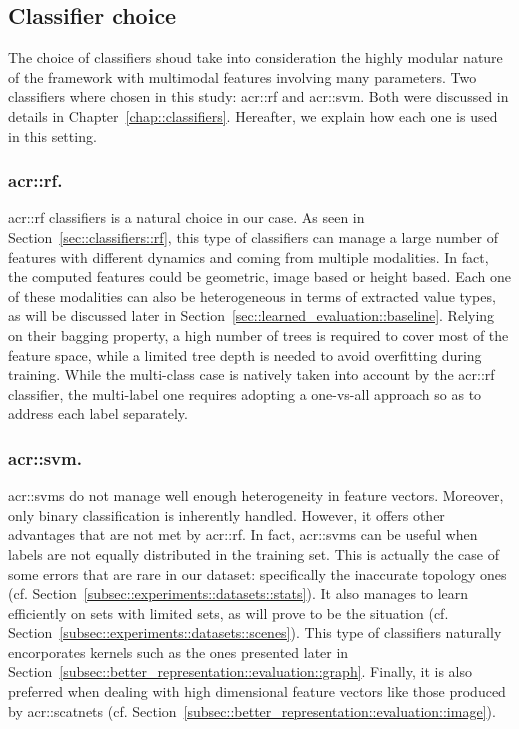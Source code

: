     \subsection{Classifier choice}
        \label{subsec::learned_evaluation::classification::classifiers}
        The choice of classifiers shoud take into consideration the highly modular nature of the framework with multimodal features involving many parameters.
        Two classifiers where chosen in this study: \gls{acr::rf} and \gls{acr::svm}.
        Both were discussed in details in Chapter~\ref{chap::classifiers}.
        Hereafter, we explain how each one is used in this setting.

        \subsubsection{\acrlong*{acr::rf}.}
            \gls{acr::rf} classifiers is a natural choice in our case.
            As seen in Section~\ref{sec::classifiers::rf}, this type of classifiers can manage a large number of features with different dynamics and coming from multiple modalities.
            In fact, the computed features could be geometric, image based or height based.
            Each one of these modalities can also be heterogeneous in terms of extracted value types, as will be discussed later in Section~\ref{sec::learned_evaluation::baseline}.
            Relying on their bagging property, a high number of trees is required to cover most of the feature space, while a limited tree depth is needed to avoid overfitting during training.
            While the multi-class case is natively taken into account by the \gls{acr::rf} classifier, the multi-label one requires adopting a one-vs-all approach so as to address each label separately.

        \subsubsection{\acrshort*{acr::svm}.}
            \glspl{acr::svm} do not manage well enough heterogeneity in feature vectors.
            Moreover, only binary classification is inherently handled.
            However, it offers other advantages that are not met by \gls{acr::rf}.
            In fact, \glspl{acr::svm} can be useful when labels are not equally distributed in the training set.
            This is actually the case of some errors that are rare in our dataset: specifically the inaccurate topology ones (cf. Section~\ref{subsec::experiments::datasets::stats}).
            It also manages to learn efficiently on sets with limited sets, as will prove to be the situation (cf. Section~\ref{subsec::experiments::datasets::scenes}). 
            This type of classifiers naturally encorporates kernels such as the ones presented later in Section~\ref{subsec::better_representation::evaluation::graph}.
            Finally, it is also preferred when dealing with high dimensional feature vectors like those produced by \glspl{acr::scatnet} (cf. Section~\ref{subsec::better_representation::evaluation::image}).

